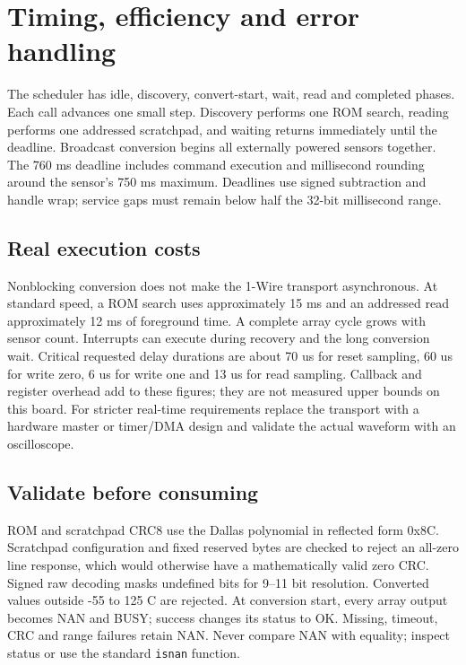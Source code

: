 \section{Timing, efficiency and error handling}
The scheduler has idle, discovery, convert-start, wait, read and completed phases.
Each call advances one small step. Discovery performs one ROM search, reading
performs one addressed scratchpad, and waiting returns immediately until the
deadline. Broadcast conversion begins all externally powered sensors together.
The 760 ms deadline includes command execution and millisecond rounding around
the sensor's 750 ms maximum. Deadlines use signed subtraction and handle wrap;
service gaps must remain below half the 32-bit millisecond range.

\subsection{Real execution costs}
Nonblocking conversion does not make the 1-Wire transport asynchronous. At
standard speed, a ROM search uses approximately 15 ms and an addressed read
approximately 12 ms of foreground time. A complete array cycle grows with sensor
count. Interrupts can execute during recovery and the long conversion wait.
Critical requested delay durations are about 70 us for reset sampling, 60 us for
write zero, 6 us for write one and 13 us for read sampling. Callback and register
overhead add to these figures; they are not measured upper bounds on this board.
For stricter real-time requirements replace the transport with a hardware master
or timer/DMA design and validate the actual waveform with an oscilloscope.

\subsection{Validate before consuming}
ROM and scratchpad CRC8 use the Dallas polynomial in reflected form 0x8C.
Scratchpad configuration and fixed reserved bytes are checked to reject an
all-zero line response, which would otherwise have a mathematically valid zero
CRC. Signed raw decoding masks undefined bits for 9--11 bit resolution. Converted
values outside -55 to 125 C are rejected. At conversion start, every array output
becomes NAN and BUSY; success changes its status to OK. Missing, timeout, CRC and
range failures retain NAN. Never compare NAN with equality; inspect status or
use the standard \texttt{isnan} function.

